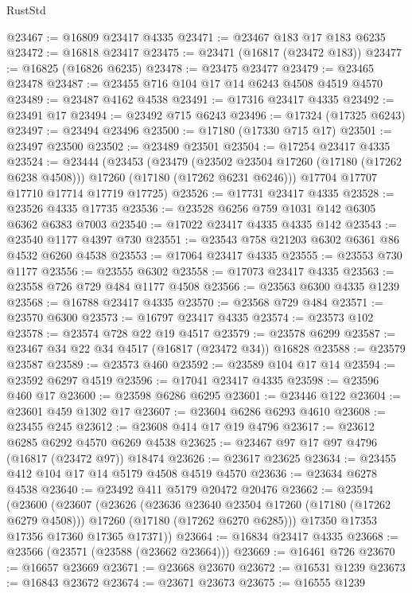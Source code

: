 \begin{lexlean}{RustStd}
\begin{coremodule}
@23467 := @16809 @23417 @4335
@23471 := @23467 @183 @17 @183 @6235
@23472 := @16818 @23417
@23475 := @23471 (@16817 (@23472 @183))
@23477 := @16825 (@16826 @6235)
@23478 := @23475 @23477
@23479 := @23465 @23478
@23487 := @23455 @716 @104 @17 @14 @6243 @4508 @4519 @4570
@23489 := @23487 @4162 @4538
@23491 := @17316 @23417 @4335
@23492 := @23491 @17
@23494 := @23492 @715 @6243
@23496 := @17324 (@17325 @6243)
@23497 := @23494 @23496
@23500 := @17180 (@17330 @715 @17)
@23501 := @23497 @23500
@23502 := @23489 @23501
@23504 := @17254 @23417 @4335
@23524 := @23444
    (@23453
      (@23479
        (@23502 @23504 @17260 (@17180 (@17262 @6238 @4508)))
        @17260
        (@17180 (@17262 @6231 @6246)))
      @17704
      @17707
      @17710
      @17714
      @17719
      @17725)
@23526 := @17731 @23417 @4335
@23528 := @23526 @4335 @17735
@23536 := @23528 @6256 @759 @1031 @142 @6305 @6362 @6383 @7003
@23540 := @17022 @23417 @4335 @4335 @142
@23543 := @23540 @1177 @4397 @730
@23551 := @23543 @758 @21203 @6302 @6361 @86 @4532 @6260 @4538
@23553 := @17064 @23417 @4335
@23555 := @23553 @730 @1177
@23556 := @23555 @6302
@23558 := @17073 @23417 @4335
@23563 := @23558 @726 @729 @484 @1177 @4508
@23566 := @23563 @6300 @4335 @1239
@23568 := @16788 @23417 @4335
@23570 := @23568 @729 @484
@23571 := @23570 @6300
@23573 := @16797 @23417 @4335
@23574 := @23573 @102
@23578 := @23574 @728 @22 @19 @4517
@23579 := @23578 @6299
@23587 := @23467 @34 @22 @34 @4517 (@16817 (@23472 @34)) @16828
@23588 := @23579 @23587
@23589 := @23573 @460
@23592 := @23589 @104 @17 @14
@23594 := @23592 @6297 @4519
@23596 := @17041 @23417 @4335
@23598 := @23596 @460 @17
@23600 := @23598 @6286 @6295
@23601 := @23446 @122
@23604 := @23601 @459 @1302 @17
@23607 := @23604 @6286 @6293 @4610
@23608 := @23455 @245
@23612 := @23608 @414 @17 @19 @4796
@23617 := @23612 @6285 @6292 @4570 @6269 @4538
@23625 := @23467 @97 @17 @97 @4796 (@16817 (@23472 @97)) @18474
@23626 := @23617 @23625
@23634 := @23455 @412 @104 @17 @14 @5179 @4508 @4519 @4570
@23636 := @23634 @6278 @4538
@23640 := @23492 @411 @5179 @20472 @20476
@23662 := @23594
    (@23600
      (@23607
        (@23626
          (@23636 @23640 @23504 @17260 (@17180 (@17262 @6279 @4508)))
          @17260
          (@17180 (@17262 @6270 @6285)))
        @17350
        @17353
        @17356
        @17360
        @17365
        @17371))
@23664 := @16834 @23417 @4335
@23668 := @23566 (@23571 (@23588 (@23662 @23664)))
@23669 := @16461 @726
@23670 := @16657 @23669
@23671 := @23668 @23670
@23672 := @16531 @1239
@23673 := @16843 @23672
@23674 := @23671 @23673
@23675 := @16555 @1239

\end{coremodule}
\end{lexlean}
